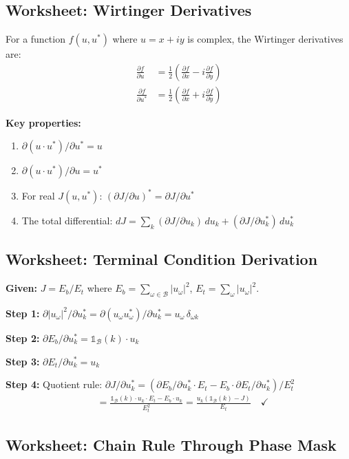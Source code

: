 \documentclass[12pt,a4paper]{article}
\newcommand{\pdv}[2]{\frac{\partial #1}{\partial #2}}
\theoremstyle{definition}
\begin{document}
\subsection{Worksheet: Wirtinger Derivatives}

For a function $f(u, u^*)$ where $u = x + iy$ is complex, the Wirtinger derivatives are:
\begin{align}
\pdv{f}{u} &= \frac{1}{2}\left(\pdv{f}{x} - i\pdv{f}{y}\right) \\
\pdv{f}{u^*} &= \frac{1}{2}\left(\pdv{f}{x} + i\pdv{f}{y}\right)
\end{align}

\textbf{Key properties:}
\begin{enumerate}
\item $\partial(u \cdot u^*)/\partial u^* = u$
\item $\partial(u \cdot u^*)/\partial u = u^*$
\item For real $J(u,u^*)$: $(\partial J/\partial u)^* = \partial J/\partial u^*$
\item The total differential: $dJ = \sum_k (\partial J/\partial u_k)\,du_k + (\partial J/\partial u_k^*)\,du_k^*$
\end{enumerate}

\subsection{Worksheet: Terminal Condition Derivation}

\textbf{Given:} $J = E_b/E_t$ where $E_b = \sum_{\omega \in \mathcal{B}}|u_\omega|^2$, $E_t = \sum_\omega |u_\omega|^2$.

\textbf{Step 1:} $\partial|u_\omega|^2/\partial u_k^* = \partial(u_\omega u_\omega^*)/\partial u_k^* = u_\omega\,\delta_{\omega k}$

\textbf{Step 2:} $\partial E_b/\partial u_k^* = \mathbb{1}_\mathcal{B}(k)\cdot u_k$

\textbf{Step 3:} $\partial E_t/\partial u_k^* = u_k$

\textbf{Step 4:} Quotient rule: $\partial J/\partial u_k^* = (\partial E_b/\partial u_k^* \cdot E_t - E_b \cdot \partial E_t/\partial u_k^*)/E_t^2$
\begin{align}
&= \frac{\mathbb{1}_\mathcal{B}(k)\cdot u_k \cdot E_t - E_b \cdot u_k}{E_t^2} = \frac{u_k(\mathbb{1}_\mathcal{B}(k) - J)}{E_t} \quad\checkmark
\end{align}

\subsection{Worksheet: Chain Rule Through Phase Mask}
\end{document}
